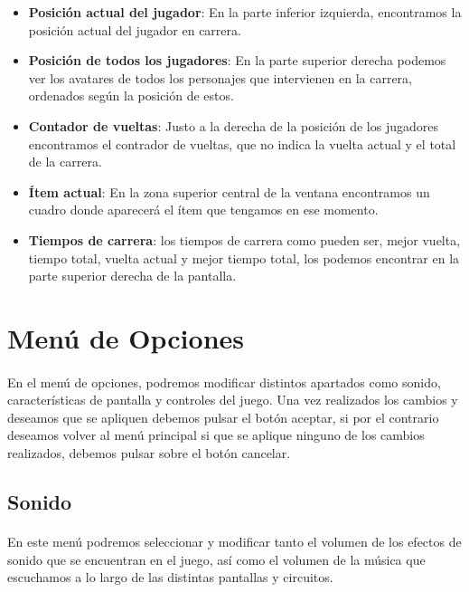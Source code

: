 \begin{itemize}
    \item \textbf{Posición actual del jugador}: En la parte inferior izquierda, encontramos la posición actual del 
    jugador en carrera.
    
    \item \textbf{Posición de todos los jugadores}: En la parte superior derecha podemos ver los avatares de todos los personajes
    que intervienen en la carrera, ordenados según la posición de estos.
    
    \item \textbf{Contador de vueltas}: Justo a la derecha de la posición de los jugadores encontramos el
    contrador de vueltas, que no indica la vuelta actual y el total de la carrera.
    
    \item \textbf{Ítem actual}: En la zona superior central de la ventana encontramos un cuadro donde aparecerá el ítem que tengamos
    en ese momento.
    
    \item \textbf{Tiempos de carrera}: los tiempos de carrera como pueden ser, mejor vuelta, tiempo total, vuelta actual y mejor 
    tiempo total, los podemos encontrar en la parte superior derecha de la pantalla.
\end{itemize}

\section{Menú de Opciones}

\paragraph{}
En el menú de opciones, podremos modificar distintos apartados como sonido, características de pantalla y controles del juego. 
Una vez realizados los cambios y deseamos que se apliquen debemos pulsar el botón aceptar, si por el contrario deseamos volver al
menú principal si que se aplique ninguno de los cambios realizados, debemos pulsar sobre el botón cancelar.

\subsection{Sonido}

\paragraph{}
En este menú podremos seleccionar y modificar tanto el volumen de los efectos de sonido que se encuentran en el juego, así 
como el volumen de la música que escuchamos a lo largo de las distintas pantallas y circuitos.

